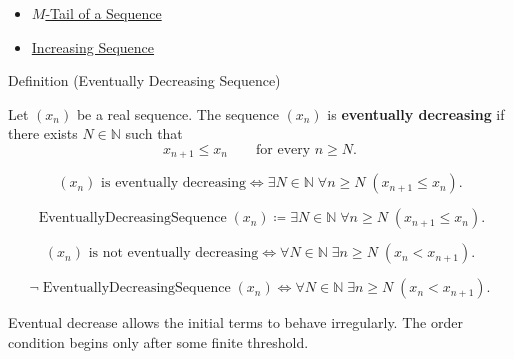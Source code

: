 \begin{dependencies}
\begin{itemize}
  \item \hyperref[def:m-tail]{$M$-Tail of a Sequence}
  \item \hyperref[def:increasing-sequence]{Increasing Sequence}
\end{itemize}
\end{dependencies}


\begin{definitionbox}{Definition (Eventually Decreasing Sequence)}
\begin{definition}
\label{def:eventually-decreasing-sequence}
Let $(x_n)$ be a real sequence. The sequence $(x_n)$ is
\textbf{eventually decreasing} if there exists $N\in\mathbb{N}$ such that
\[
  x_{n+1} \le x_n
  \qquad
  \text{for every } n\ge N.
\]
\end{definition}
\end{definitionbox}

\begin{remark*}
\[
(x_n)\text{ is eventually decreasing}
\Longleftrightarrow
\exists N\in\mathbb{N}\;\forall n\ge N\;(x_{n+1}\le x_n).
\]
\end{remark*}

\begin{remark*}
\[
\operatorname{EventuallyDecreasingSequence}(x_n)
\coloneqq
\exists N\in\mathbb{N}\;\forall n\ge N\;(x_{n+1}\le x_n).
\]
\end{remark*}

\begin{remark*}
\[
(x_n)\text{ is not eventually decreasing}
\Longleftrightarrow
\forall N\in\mathbb{N}\;\exists n\ge N\;(x_n<x_{n+1}).
\]
\end{remark*}

\begin{remark*}
\[
\neg\operatorname{EventuallyDecreasingSequence}(x_n)
\Longleftrightarrow
\forall N\in\mathbb{N}\;\exists n\ge N\;(x_n<x_{n+1}).
\]
\end{remark*}

\begin{remark*}[Interpretation]
Eventual decrease allows the initial terms to behave irregularly. The order
condition begins only after some finite threshold.
\end{remark*}

